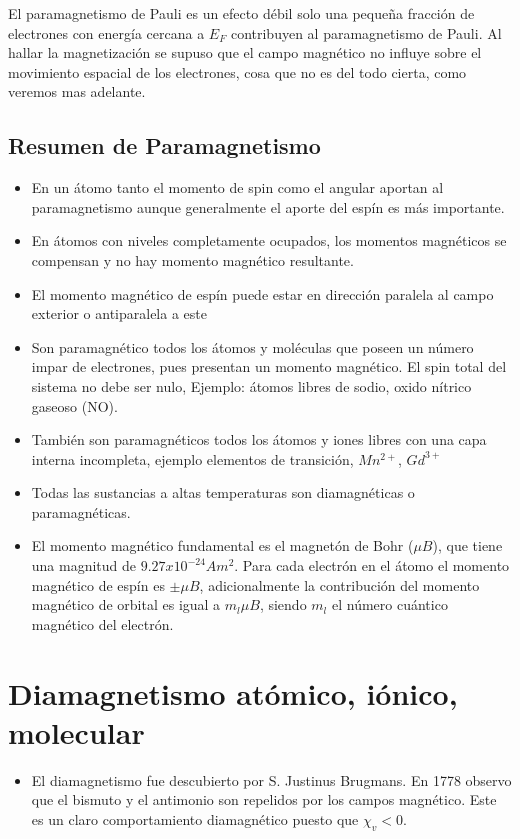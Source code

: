 El paramagnetismo de Pauli es un efecto débil solo una pequeña fracción de electrones con energía cercana a $E_{F}$ contribuyen al paramagnetismo de Pauli. Al hallar la magnetización se supuso que el campo magnético no influye sobre el movimiento espacial de los electrones, cosa que no es del todo cierta, como veremos mas adelante.

\subsection{Resumen de Paramagnetismo}

\begin{itemize}
	\item En un átomo tanto el momento de spin como el angular aportan al paramagnetismo aunque generalmente el aporte del espín es más importante.
	\item En átomos con niveles completamente ocupados, los momentos magnéticos se compensan y no
hay momento magnético resultante.
	\item El momento magnético de espín puede estar en dirección paralela al campo exterior o antiparalela a
este
	\item Son paramagnético todos los átomos y moléculas que poseen un número impar de electrones, pues presentan un momento magnético. El spin total del sistema no debe ser nulo, Ejemplo: átomos libres de sodio, oxido nítrico gaseoso (NO).
	\item También son paramagnéticos todos los átomos y iones libres con una capa interna incompleta, ejemplo elementos de transición, $Mn^{2+}$, $Gd^{3+}$
	\item Todas las sustancias a altas temperaturas son diamagnéticas o paramagnéticas.
	\item El momento magnético fundamental es el magnetón de Bohr ($\mu B$), que tiene una magnitud de  $9.27x10^{-24} Am^{2}$. Para cada electrón en el átomo el momento magnético de espín es $\pm\mu B$, adicionalmente la contribución del momento magnético de orbital es igual a $m_{l}\mu B$, siendo $m_{l}$ el número cuántico magnético del electrón.
\end{itemize}


\section{Diamagnetismo atómico, iónico, molecular}

\begin{itemize}
	\item El diamagnetismo fue descubierto por S. Justinus Brugmans. En 1778 observo que el bismuto y el antimonio son repelidos por los campos magnético. Este es un claro comportamiento diamagnético puesto que $\chi_{v}<0$.
\end{itemize}

